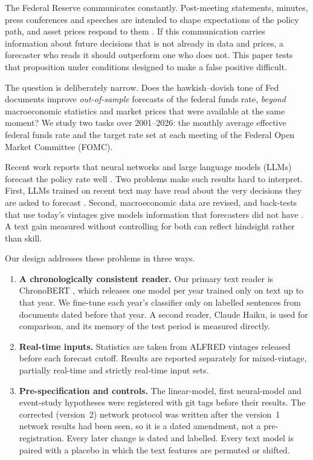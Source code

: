 \documentclass[11pt]{article}
\begin{document}
The Federal Reserve communicates constantly. Post-meeting statements, minutes, press conferences and speeches
are intended to shape expectations of the policy path, and asset prices respond to them
\citep{gss2005,hansen2016}. If this communication carries information about future decisions that is not already
in data and prices, a forecaster who reads it should outperform one who does not. This paper tests that
proposition under conditions designed to make a false positive difficult.

The question is deliberately narrow. Does the hawkish--dovish tone of Fed documents improve \emph{out-of-sample}
forecasts of the federal funds rate, \emph{beyond} macroeconomic statistics and market prices that were available
at the same moment? We study two tasks over 2001--2026: the monthly average effective federal funds rate and the
target rate set at each meeting of the Federal Open Market Committee (FOMC).

Recent work reports that neural networks and large language models (LLMs) forecast the policy rate well
\citep{chanlau2025}. Two problems make such results hard to interpret. First, LLMs trained on recent text may have
read about the very decisions they are asked to forecast \citep{lopezlira2025,sarkar2024,crane2025}. Second,
macroeconomic data are revised, and back-tests that use today's vintages give models information that forecasters
did not have \citep{croushore2001}. A text gain measured without controlling for both can reflect hindsight
rather than skill.

Our design addresses these problems in three ways.
\begin{enumerate}
  \item \textbf{A chronologically consistent reader.} Our primary text reader is ChronoBERT \citep{he2025}, which
        releases one model per year trained only on text up to that year. We fine-tune each year's classifier only
        on labelled sentences from documents dated before that year. A second reader, Claude Haiku, is used for
        comparison, and its memory of the test period is measured directly.
  \item \textbf{Real-time inputs.} Statistics are taken from ALFRED vintages released before each forecast cutoff.
        Results are reported separately for mixed-vintage, partially real-time and strictly real-time input sets.
  \item \textbf{Pre-specification and controls.} The linear-model, first neural-model and event-study
        hypotheses were registered with git tags before their results. The corrected (version~2) network
        protocol was written after the version~1 network results had been seen, so it is a dated amendment, not a
        pre-registration. Every later change is dated and labelled. Every text model is paired with a placebo
        in which the text features are permuted or shifted.
\end{enumerate}
\end{document}
